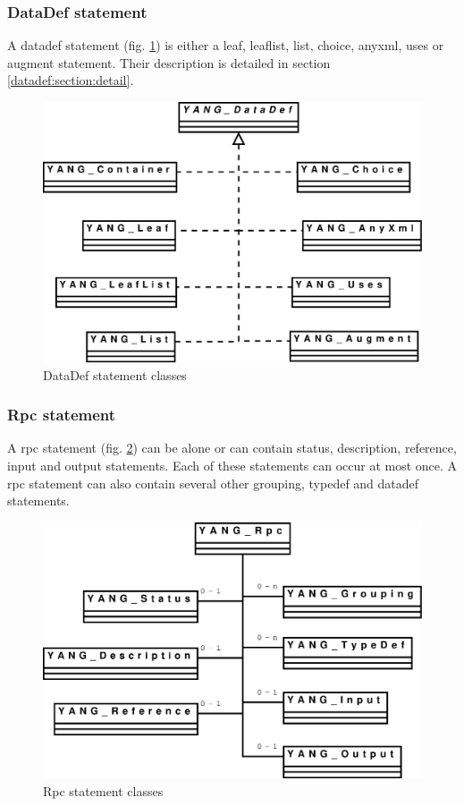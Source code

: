 \documentclass[a4paper]{article}
\begin{document}
\subsubsection{DataDef statement}
\label{datadef:section:global}

A datadef  statement (fig. \ref{datadef}) is either  a leaf, leaflist,
list, choice,  anyxml, uses or augment  statement. Their description is
detailed in section \ref{datadef:section:detail}.
\begin{figure}[htbp]
\begin{center}
\includegraphics[scale = .3]{datadef.eps}
\end{center}
\caption{DataDef statement classes}
\label{datadef}
\end{figure}

\subsubsection{Rpc statement}

A rpc statement (fig.  \ref{rpc})  can be alone or can contain status,
description, reference,  input and  output statements.  Each  of these
statements can occur  at most once.  A rpc  statement can also contain
several other grouping, typedef and datadef statements.
\begin{figure}[htbp]
\begin{center}
\includegraphics[scale = .3]{rpc.eps}
\end{center}
\caption{Rpc statement classes}
\label{rpc}
\end{figure}
\end{document}
